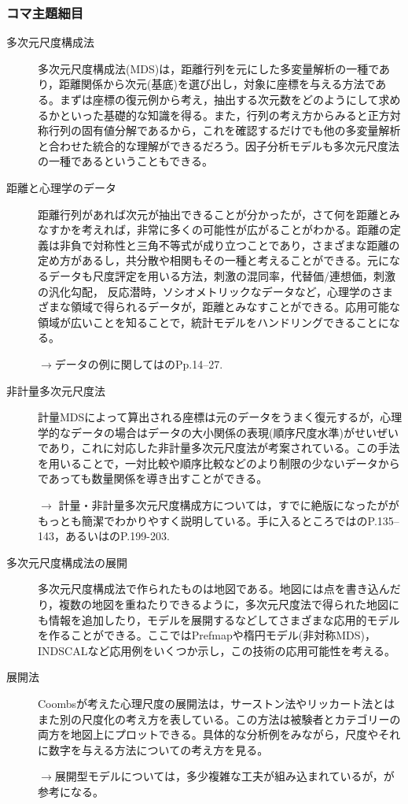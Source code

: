 \subsubsection{コマ主題細目}
\begin{description}
	\item[多次元尺度構成法] 多次元尺度構成法(MDS)は，距離行列を元にした多変量解析の一種であり，距離関係から次元(基底)を選び出し，対象に座標を与える方法である。まずは座標の復元例から考え，抽出する次元数をどのようにして求めるかといった基礎的な知識を得る。また，行列の考え方からみると正方対称行列の固有値分解であるから，これを確認するだけでも他の多変量解析と合わせた統合的な理解ができるだろう。因子分析モデルも多次元尺度法の一種であるということもできる。



	\item[距離と心理学のデータ] 距離行列があれば次元が抽出できることが分かったが，さて何を距離とみなすかを考えれば，非常に多くの可能性が広がることがわかる。距離の定義は非負で対称性と三角不等式が成り立つことであり，さまざまな距離の定め方があるし，共分散や相関もその一種と考えることができる。元になるデータも尺度評定を用いる方法，刺激の混同率，代替価/連想価，刺激の汎化勾配，    反応潜時，ソシオメトリックなデータなど，心理学のさまざまな領域で得られるデータが，距離とみなすことができる。応用可能な領域が広いことを知ることで，統計モデルをハンドリングできることになる。
	      \begin{flushright}
		      $\to$データの例に関しては\citet{Takane198002}のPp.14--27.
	      \end{flushright}
	\item[非計量多次元尺度法] 計量MDSによって算出される座標は元のデータをうまく復元するが，心理学的なデータの場合はデータの大小関係の表現(順序尺度水準)がせいぜいであり，これに対応した非計量多次元尺度法が考案されている。この手法を用いることで，一対比較や順序比較などのより制限の少ないデータからであっても数量関係を導き出すことができる。
	      \begin{flushright}
		      $\to$ 計量・非計量多次元尺度構成方については，すでに絶版になったが\citet{Okada19940115}がもっとも簡潔でわかりやすく説明している。手に入るところでは\citet{Adachi200607}のP.135--143，あるいは\citet{kosugi2019b}のP.199-203.
	      \end{flushright}
	\item[多次元尺度構成法の展開]多次元尺度構成法で作られたものは地図である。地図には点を書き込んだり，複数の地図を重ねたりできるように，多次元尺度法で得られた地図にも情報を追加したり，モデルを展開するなどしてさまざまな応用的モデルを作ることができる。ここではPrefmapや楕円モデル(非対称MDS)，INDSCALなど応用例をいくつか示し，この技術の応用可能性を考える。
	\item[展開法] Coombsが考えた心理尺度の展開法は，サーストン法やリッカート法とはまた別の尺度化の考え方を表している。この方法は被験者とカテゴリーの両方を地図上にプロットできる。具体的な分析例をみながら，尺度やそれに数字を与える方法についての考え方を見る。
	      \begin{flushright}
		      $\to$展開型モデルについては，多少複雑な工夫が組み込まれているが，\citet{shimizu2018}が参考になる。
	      \end{flushright}


\end{description}
